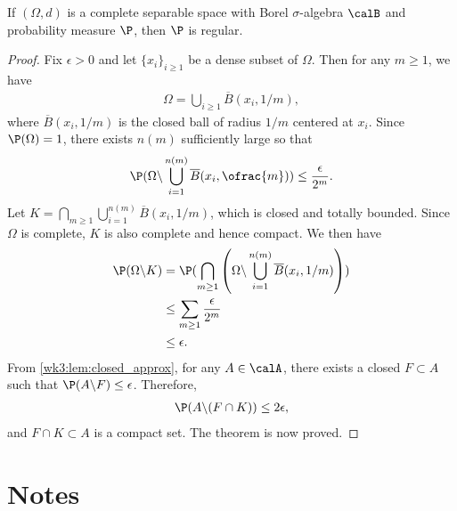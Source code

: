 \documentclass[../aipt.tex]{subfiles}
\begin{document}
\begin{Theorem}[Ulam]\label{wk3:thm:Ulam}
If $(\Omega, d)$ is a complete separable space with Borel $\sigma$-algebra $\calB$ and probability measure $\P$, then $\P$ is regular.
\end{Theorem}
\begin{proof}
Fix $\epsilon >0$ and let $\{x_i\}_{i\geq 1}$ be a dense subset of $\Omega$. Then for any $m\geq 1$, we have
\begin{align*}
\Omega = \bigcup_{i\geq 1} \overline{B}(x_i,1/m),
\end{align*}
where $\overline{B}(x_i,1/m)$ is the closed ball of radius $1/m$ centered at $x_i$. Since $\P(\Omega)=1$, there exists $n(m)$ sufficiently large so that 
\begin{align*}
\P(\Omega\backslash\bigcup_{i=1}^{n(m)} \overline{B}(x_i,\ofrac{m})) \leq \frac{\epsilon}{2^m}.
\end{align*}
Let $K = \displaystyle\bigcap_{m\geq 1}\bigcup_{i=1}^{n(m)} \overline{B}(x_i,1/m)$, which is closed and totally bounded. Since $\Omega$ is complete, $K$ is also complete and hence compact. We then have
\begin{align*}
\P(\Omega\backslash K) 
&= \P(\bigcap_{m\geq 1} \left(\Omega\backslash\bigcup_{i=1}^{n(m)} \overline{B}(x_i,1/m)\right))\\
&\leq \sum_{m\geq 1} \frac{\epsilon}{2^m}\\
&\leq \epsilon.
\end{align*}
From \cref{wk3:lem:closed_approx}, for any $A\in\calA$, there exists a closed $F\subset A$ such that $\P(A\backslash F) \leq \epsilon$. Therefore, 
\begin{align*}
\P(A\backslash(F\cap K)) \leq 2\epsilon,
\end{align*}
and $F\cap K \subset A$ is a compact set. The theorem is now proved. 
\end{proof}


\section{Notes}
\end{document}
